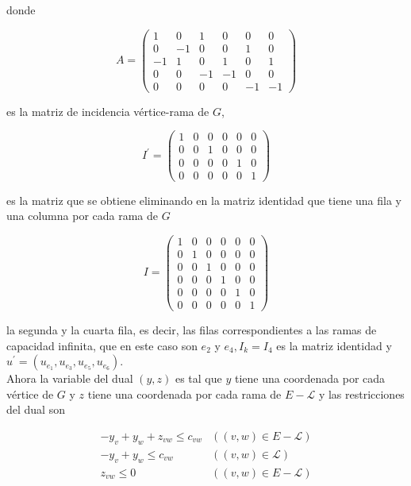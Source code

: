 \documentclass[10pt]{article}
\begin{document}
donde

$$
A=\left(\begin{array}{cccccc}
1 & 0 & 1 & 0 & 0 & 0 \\
0 & -1 & 0 & 0 & 1 & 0 \\
-1 & 1 & 0 & 1 & 0 & 1 \\
0 & 0 & -1 & -1 & 0 & 0 \\
0 & 0 & 0 & 0 & -1 & -1
\end{array}\right)
$$

es la matriz de incidencia vértice-rama de $G$,

$$
I^{\prime}=\left(\begin{array}{cccccc}
1 & 0 & 0 & 0 & 0 & 0 \\
0 & 0 & 1 & 0 & 0 & 0 \\
0 & 0 & 0 & 0 & 1 & 0 \\
0 & 0 & 0 & 0 & 0 & 1
\end{array}\right)
$$

es la matriz que se obtiene eliminando en la matriz identidad que tiene una fila y una columna por cada rama de $G$

$$
I=\left(\begin{array}{llllll}
1 & 0 & 0 & 0 & 0 & 0 \\
0 & 1 & 0 & 0 & 0 & 0 \\
0 & 0 & 1 & 0 & 0 & 0 \\
0 & 0 & 0 & 1 & 0 & 0 \\
0 & 0 & 0 & 0 & 1 & 0 \\
0 & 0 & 0 & 0 & 0 & 1
\end{array}\right)
$$

la segunda y la cuarta fila, es decir, las filas correspondientes a las ramas de capacidad infinita, que en este caso son $e_{2}$ y $e_{4}, I_{k}=I_{4}$ es la matriz identidad y $u^{\prime}=\left(u_{e_{1}}, u_{e_{3}}, u_{e_{5}}, u_{e_{6}}\right)$.\\
Ahora la variable del dual $(y, z)$ es tal que $y$ tiene una coordenada por cada vértice de $G$ y $z$ tiene una coordenada por cada rama de $E-\mathcal{L}$ y las restricciones del dual son

$$
\begin{array}{cc}
-y_{v}+y_{w}+z_{v w} \leq c_{v w} & ((v, w) \in E-\mathcal{L}) \\
-y_{v}+y_{w} \leq c_{v w} & ((v, w) \in \mathcal{L}) \\
z_{v w} \leq 0 & ((v, w) \in E-\mathcal{L})
\end{array}
$$
\end{document}
